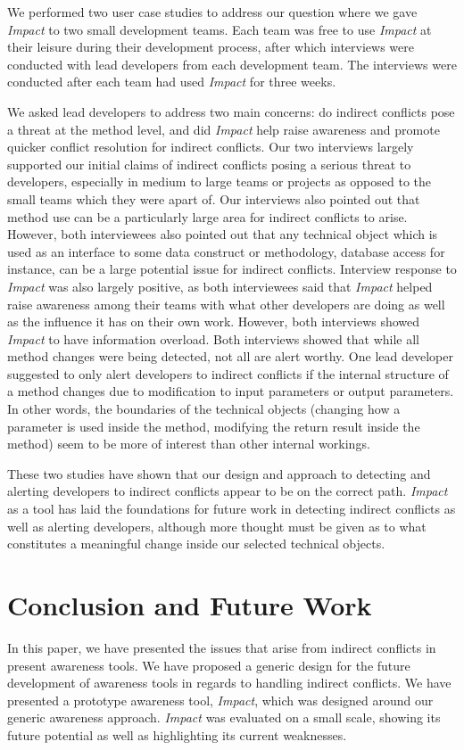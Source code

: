 \documentclass[conference]{IEEEtran}
\begin{document}
We performed two user case studies to address our question where
we gave \textit{Impact} to two small development teams. Each team was
free to use \textit{Impact} at their leisure during their development process,
after which interviews were conducted with lead developers from 
each development team. The interviews were conducted after each
team had used \textit{Impact} for three weeks.

We asked lead developers to address two main concerns: do indirect
conflicts pose a threat at the method level, and did \textit{Impact} help raise
awareness and promote quicker conflict resolution for indirect
conflicts. Our two interviews largely supported our initial claims of
indirect conflicts posing a serious threat to developers, especially
in medium to large teams or projects as opposed to the small
teams which they were apart of. Our interviews also pointed
out that method use can be a particularly large area for indirect
conflicts to arise. However, both interviewees also pointed out that
any technical object which is used as an interface to some data
construct or methodology, database access for instance, can be 
a large potential issue for indirect conflicts.  Interview response to
\textit{Impact} was also largely positive, as both interviewees said that \textit{Impact}
helped raise awareness among their teams with what other developers
are doing as well as the influence it has on their own work. However,
both interviews showed \textit{Impact} to have information overload. Both
interviews showed that while all method changes were being detected,
not all are alert worthy. One lead developer suggested to only alert
developers to indirect conflicts if the internal structure of a method
changes due to modification to input parameters or output parameters.
In other words, the boundaries of the technical objects (changing
how a parameter is used inside the method, modifying the return
result inside the method) seem to be more of interest than other 
internal workings.

These two studies have shown that our design and approach to
detecting and alerting developers to indirect conflicts appear
to be on the correct path. \textit{Impact} as a tool has laid the foundations
for future work in detecting indirect conflicts as well as alerting
developers, although more thought must be given as to 
what constitutes a meaningful change inside our selected 
technical objects.


\section{Conclusion and Future Work}
In this paper, we have presented the issues that arise from indirect 
conflicts in present awareness tools. We have proposed a generic 
design for the future development of awareness tools in regards to
handling indirect conflicts. We have presented a prototype 
awareness tool, \textit{Impact}, which was designed around our generic 
awareness approach. \textit{Impact} was evaluated on a small scale, showing
its future potential as well as highlighting its current weaknesses.
\end{document}
